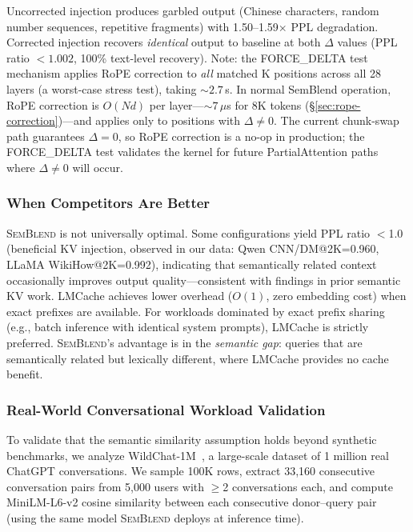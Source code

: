 \documentclass[10pt,twocolumn]{article}
\newcommand{\semblend}{\textsc{SemBlend}\xspace}
\begin{document}
\noindent
Uncorrected injection produces garbled output (Chinese characters,
random number sequences, repetitive fragments) with 1.50--1.59$\times$
PPL degradation. Corrected injection recovers \emph{identical} output
to baseline at both $\Delta$ values (PPL ratio $< 1.002$, 100\%
text-level recovery). Note: the FORCE\_DELTA test mechanism applies RoPE correction to
\emph{all} matched K positions across all 28 layers (a worst-case
stress test), taking ${\sim}2.7$\,s. In normal SemBlend operation,
RoPE correction is $O(Nd)$ per layer---${\sim}7\,\mu$s for 8K
tokens (\S\ref{sec:rope-correction})---and applies only to
positions with $\Delta{\neq}0$. The current chunk-swap path
guarantees $\Delta{=}0$, so RoPE correction is a no-op in
production; the FORCE\_DELTA test validates the kernel for
future PartialAttention paths where $\Delta{\neq}0$ will occur.

\subsubsection{When Competitors Are Better}

\semblend is not universally optimal. Some configurations yield
PPL ratio $<$1.0 (beneficial KV injection, observed in our data:
Qwen CNN/DM@2K=0.960, LLaMA WikiHow@2K=0.992), indicating that semantically related context occasionally
improves output quality---consistent with findings in prior semantic
KV work. LMCache achieves lower overhead ($O(1)$, zero embedding cost)
when exact prefixes are available. For workloads dominated by exact prefix sharing (e.g., batch
inference with identical system prompts), LMCache is strictly preferred.
\semblend's advantage is in the \emph{semantic gap}: queries that are
semantically related but lexically different, where LMCache provides
no cache benefit.

\subsubsection{Real-World Conversational Workload Validation}
\label{sec:analysis:wildchat}

To validate that the semantic similarity assumption holds beyond
synthetic benchmarks, we analyze WildChat-1M~\cite{zhao2024wildchat},
a large-scale dataset of 1 million real ChatGPT conversations. We
sample 100K rows, extract 33,160 consecutive conversation pairs from
5,000 users with $\geq$2 conversations each, and compute MiniLM-L6-v2
cosine similarity between each consecutive donor--query pair
(using the same model \semblend deploys at inference time).
\end{document}
